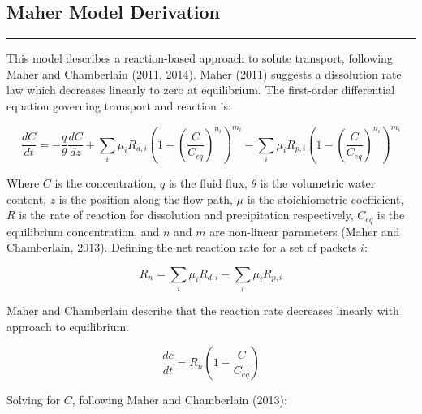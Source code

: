\FloatBarrier

\newpage
\begin{tcolorbox}[
    colback=white,
    colframe=white,
    sharp corners,
    boxrule=0pt,
    breakable,
    width=\dimexpr\textwidth+1cm\relax,
    enlarge left by=-0.5cm,
    leftrule=0mm, rightrule=0mm, toprule=0mm, bottomrule=0mm
]


\subsection*{Maher Model Derivation}
\vspace{-5mm}
{\footnotesize

\noindent\rule{\textwidth}{0.5pt}

This model describes a reaction-based approach to solute transport, following Maher and Chamberlain (2011, 2014). Maher (2011) suggests a dissolution rate law which decreases linearly to zero at equilibrium. The first-order differential equation governing transport and reaction is:

\begin{equation}
    \frac{dC}{dt} = -\frac{q}{\theta} \frac{dC}{dz} + \sum_i \mu_i R_{d,i} \left( 1 - \left( \frac{C}{C_{eq}} \right)^{n_i} \right)^{m_i} - \sum_i \mu_i R_{p,i} \left( 1 - \left( \frac{C}{C_{eq}} \right)^{n_i} \right)^{m_i}
\end{equation}

Where \( C \) is the concentration, \( q \) is the fluid flux, \( \theta \) is the volumetric water content, \( z \) is the position along the flow path, \( \mu \) is the stoichiometric coefficient, \( R \) is the rate of reaction for dissolution and precipitation respectively, \( C_{eq} \) is the equilibrium concentration, and \( n \) and \( m \) are non-linear parameters (Maher and Chamberlain, 2013). Defining the net reaction rate for a set of packets $i$:

\begin{equation}
    R_n = \sum_i \mu_i R_{d,i} - \sum_i \mu_i R_{p,i}
\end{equation}

Maher and Chamberlain describe that the reaction rate decreases linearly with approach to equilibrium.

\begin{equation}
    \frac{dc}{dt} = R_n \left( 1 - \frac{C}{C_{eq}} \right)
\end{equation}

Solving for \( C \), following Maher and Chamberlain (2013):

}
\end{tcolorbox}
